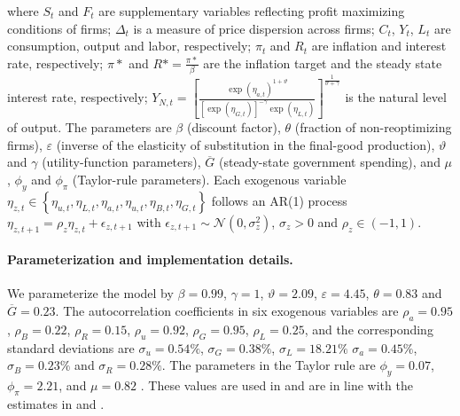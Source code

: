 where $S_{t}$ and $F_{t}$ are supplementary variables reflecting profit
maximizing conditions of firms; $\Delta _{t}$ is a measure of price dispersion
across firms; $C_{t}$, $Y_{t}$, $L_{t}$ are consumption, output and labor,
respectively; $\pi _{t}$ and $R_{t}$ are inflation and interest rate,
respectively; $\pi {\ast }$ and $R{\ast } = \frac{\pi {\ast }}{\beta }$ are
the inflation target and the steady state interest rate, respectively;
$Y_{N,t}=\left[ \frac{\exp \left( \eta _{a,t}\right) ^{1+\vartheta }}{\left[\exp \left( \eta _{G,t}\right) \right] ^{-\gamma }\exp \left( \eta_{L,t}\right) }\right] ^{\frac{1}{\vartheta +\gamma }}$
is the natural level of
output. The parameters are $\beta$ (discount factor), $\theta$ (fraction of non-reoptimizing firms), $\varepsilon$ (inverse of
the elasticity of substitution in the final-good production), $\vartheta$ and $\gamma$ (utility-function
parameters), $\overline{G}$ (steady-state government spending), and $\mu$, $\phi_{y}$ and $\phi_{\pi}$ (Taylor-rule parameters).
Each exogenous variable $\eta_{z,t} \in \left \{ \eta_{u,t},\eta_{L,t}, \eta_{a,t}, \eta_{u,t}, \eta_{B,t}, \eta_{G,t} \right \} $ follows an
AR(1) process $\eta_{z,t+1}=\rho_{z}\eta_{z,t}+\epsilon_{z,t+1}$ with
$\epsilon_{z,t+1}\sim \mathcal{N}\left( 0,\sigma _{z}^{2}\right) $, $\sigma_{z}>0$ and $\rho _{z}\in \left( -1,1\right) $.

\paragraph{Parameterization and implementation details.}

We parameterize the model by $\beta =0.99$, $\gamma =1$, $\vartheta =2.09$, $
\varepsilon =4.45$, $\theta =0.83$ and $\overline{G}=0.23$. The autocorrelation
coefficients in six exogenous variables are $\rho _{a}=0.95$ , $\rho
_{B}=0.22$, $\rho _{R}=0.15$, $\rho _{u}=0.92$, $\rho _{G}=0.95$, $ \rho
_{L}=0.25$, and the corresponding standard deviations are $\sigma _{u}=0.54\%$,
$\sigma _{G}=0.38\%$, $\sigma _{L}=18.21\%$ $\sigma _{a}=0.45\% $, $\sigma
_{B}=0.23\%$ and $\sigma _{R}=0.28\%$. The parameters in the Taylor rule are
$\phi _{y}=0.07$, $\phi _{\pi }=2.21$, and $\mu =0.82$ . These values are used
in \cite{MM2015} and are in line with the estimates in \cite{DSSW2007} and
\cite{SW2007}.

